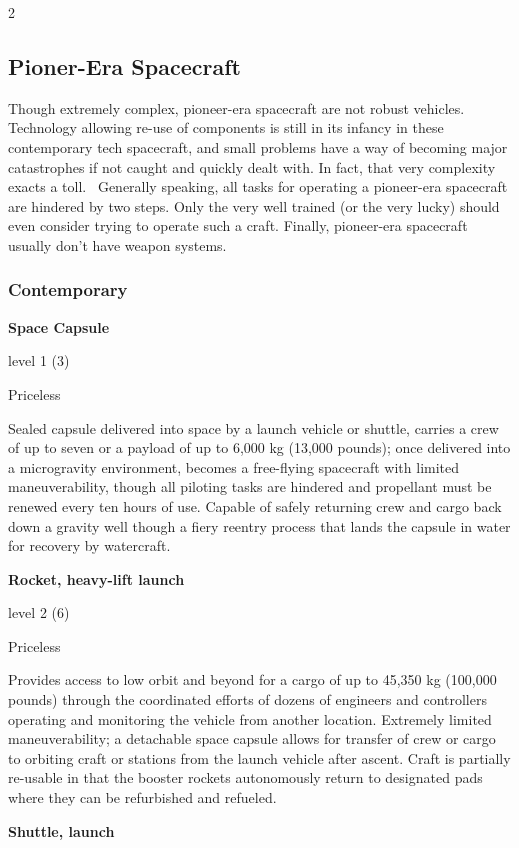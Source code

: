\begin{multicols}{2}
\subsection{Pioner-Era Spacecraft}

Though extremely complex, pioneer-era spacecraft are not robust vehicles. Technology allowing re-use of components is still in its infancy in these contemporary tech spacecraft, and small problems have a way of becoming major catastrophes if not caught and quickly dealt with. In fact, that very complexity exacts a toll. 
Generally speaking, all tasks for operating a pioneer-era spacecraft are hindered by two steps. Only the very well trained (or the very lucky) should even consider trying to operate such a craft. Finally, pioneer-era spacecraft usually don’t have weapon systems.

\subsubsection{Contemporary}

\textbf{Space Capsule}

level 1 (3) 

Priceless 

Sealed capsule delivered into space by a launch vehicle or shuttle, carries a crew of up to seven or a payload of up to 6,000 kg (13,000 pounds); once delivered into a microgravity environment, becomes a free-flying spacecraft with limited maneuverability, though all piloting tasks are hindered and propellant must be renewed every ten hours of use. Capable of safely returning crew and cargo back down a gravity well though a fiery reentry process that lands the capsule in water for recovery by watercraft. 

\textbf{Rocket, heavy-lift launch} 

level 2 (6) 

Priceless 

Provides access to low orbit and beyond for a cargo of up to 45,350 kg (100,000 pounds) through the coordinated efforts of dozens of engineers and controllers operating and monitoring the vehicle from another location. Extremely limited maneuverability; a detachable space capsule allows for transfer of crew or cargo to orbiting craft or stations from the launch vehicle after ascent. Craft is partially re-usable in that the booster rockets autonomously return to designated pads where they can be refurbished and refueled. 

\textbf{Shuttle, launch} 


\end{multicols}
